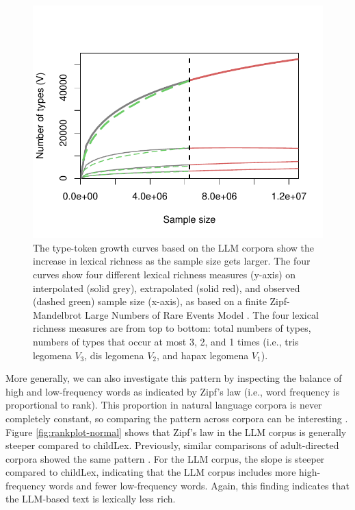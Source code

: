 \documentclass[doc, a4paper, anonymous]{apa7}
\begin{document}
\begin{figure}[!htbp]
  \centering
    \includegraphics[scale=.75]{figures/df.growth.intrextr-3.5.pdf}
    \caption{The type-token growth curves based on the LLM corpora show the increase in lexical richness as the sample size gets larger. The four curves show four different lexical richness measures (y-axis) on interpolated (solid grey), extrapolated (solid red), and observed (dashed green) sample size (x-axis), as based on a finite Zipf-Mandelbrot Large Numbers of Rare Events Model \citep[LNRE model, see][]{evert_simple_2004}. The four lexical richness measures are from top to bottom: total numbers of types, numbers of types that occur at most 3, 2, and 1 times (i.e., tris legomena $V_3$, dis legomena $V_2$, and hapax legomena $V_1$).}
    \label{fig:df.growth.intrextr}
  \hfill
\end{figure}

More generally, we can also investigate this pattern by inspecting the balance of high and low-frequency words as indicated by Zipf's law (i.e., word frequency is proportional to rank). This proportion in natural language corpora is never completely constant, so comparing the pattern across corpora can be interesting \citep[see, e.g., ][]{baayen_analyzing_2008, piantadosi_zipfs_2014, baayen_word_2001}. Figure \ref{fig:rankplot-normal} shows that Zipf's law in the LLM corpus is generally steeper compared to childLex. Previously, similar comparisons of adult-directed corpora showed the same pattern \citep[i.e., SUBTLEX and Google Book corpus, ][]{brysbaert_impact_2016}. For the LLM corpus, the slope is steeper compared to childLex, indicating that the LLM corpus includes more high-frequency words and fewer low-frequency words. Again, this finding indicates that the LLM-based text is lexically less rich.  
\end{document}
